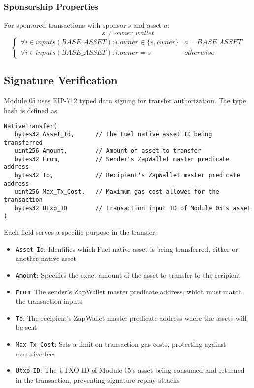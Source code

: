 \subsubsection{Sponsorship Properties}
For sponsored transactions with sponsor $s$ and asset $a$:
\[ s \neq owner\_wallet \]
\[ \begin{cases}
    \forall i \in inputs(BASE\_ASSET) : i.owner \in \{s, owner\} & a = BASE\_ASSET \\
    \forall i \in inputs(BASE\_ASSET) : i.owner = s & otherwise
\end{cases} \]



\subsection{Signature Verification}
Module 05 uses EIP-712 typed data signing for transfer authorization. The  type hash is defined as:\\

\begin{lstlisting}
NativeTransfer(
   bytes32 Asset_Id,      // The Fuel native asset ID being transferred
   uint256 Amount,        // Amount of asset to transfer
   bytes32 From,          // Sender's ZapWallet master predicate address
   bytes32 To,            // Recipient's ZapWallet master predicate address
   uint256 Max_Tx_Cost,   // Maximum gas cost allowed for the transaction
   bytes32 Utxo_ID        // Transaction input ID of Module 05's asset
)
\end{lstlisting}

Each field serves a specific purpose in the transfer:
\begin{itemize}
   \item \texttt{Asset\_Id}: Identifies which Fuel native asset is being transferred, either  or another native asset
   \item \texttt{Amount}: Specifies the exact amount of the asset to transfer to the recipient
   \item \texttt{From}: The sender's ZapWallet master predicate address, which must match the transaction inputs
   \item \texttt{To}: The recipient's ZapWallet master predicate address where the assets will be sent
   \item \texttt{Max\_Tx\_Cost}: Sets a limit on transaction gas costs, protecting against excessive fees
   \item \texttt{Utxo\_ID}: The UTXO ID of Module 05's asset being consumed and returned in the transaction, preventing signature replay attacks
\end{itemize}

